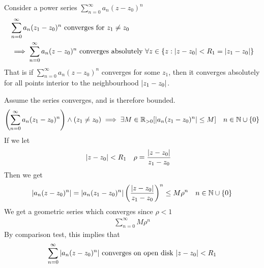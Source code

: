 \documentclass[12pt, english]{book}
\makeatletter
\renewenvironment{proof}[1][\proofname]{\par
	\pushQED{\qed}%
	\normalfont \topsep6\p@\@plus6\p@\relax
	\list{}{%
		\settowidth{\leftmargin}{\itshape\proofname:\hskip\labelsep}%
		\setlength{\labelwidth}{0pt}%
		\setlength{\itemindent}{-\leftmargin}%
		}%
	\item[\hskip\labelsep\itshape#1\@addpunct{:}]\ignorespaces
	}{\popQED\endlist\@endpefalse}
\makeatother
\begin{document}
	\begin{theorem}
		\label{Absolute Convergence of Power Series Theorem - Complex}
		Consider a power series \(\sum_{n=0}^{\infty} a_n (z-z_0)^n\)
		\begin{align*}
			&\sum_{n=0}^{\infty} a_n (z_1-z_0)^n \text{ converges for } z_1 \neq  z_0 \\ &\implies \sum_{n=0}^{\infty} a_n (z-z_0)^n \text{ converges absolutely } \forall z \in \{z : \abs{z-z_0}< R_1 = \abs{z_1 - z_0}\}
		\end{align*}
		That is if \(\sum_{n=0}^{\infty} a_n (z-z_0)^n\) converges for some \(z_1\), then it converges absolutely for all points interior to the neighbourhood \(\abs{z_1 - z_0}\).
	\end{theorem}
	\begin{proof}
		Assume the series converges, and is therefore bounded.
		\begin{align*}
			\left( \sum_{n=0}^{\infty} a_n (z_1 - z_0)^n \right) \land (z_1 \neq z_0) &\implies \exists M\in \mathbb{R}_{>0} [\abs{a_n (z_1 - z_0)^n}\leq M]	
				& n \in \mathbb{N}\cup \{0\}
		\end{align*}
		If we let
		\begin{align*}
			\abs{z-z_0} &< R_1 & \rho &= \frac{\abs{z-z_0}}{z_1 - z_0}
		\end{align*}
		Then we get 
		\begin{align*}
			\abs{a_n(z-z_0)^n} 
			&= \abs{a_n (z_1 - z_0)^n} \left(\frac{\abs{z-z_0}}{z_1 - z_0}\right)^n \leq M\rho^n
				& n \in \mathbb{N} \cup \{0\}
		\end{align*}
		We get a geometric series which converges since \(\rho<1\)
		\begin{align*}
			\sum_{n=0}^{\infty} M \rho^n
		\end{align*}
		By comparison test, this implies that 
		\begin{align*}
			\sum_{n=0}^{\infty} \abs{a_n (z-z_0)^n} \text{ converges on open disk } \abs{z-z_0}<R_1
		\end{align*}
	\end{proof}
\end{document}
